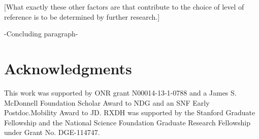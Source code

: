 \documentclass[10pt,letterpaper]{article}
\begin{document}
[What exactly these other factors are that contribute to the choice of level of reference is to be determined by further research.]

-Concluding paragraph-






\section{\bf Acknowledgments}

This work was supported by ONR grant N00014-13-1-0788 and a James S. McDonnell Foundation Scholar Award to NDG and an SNF Early Postdoc.Mobility Award to JD. RXDH was supported by the Stanford Graduate Fellowship and the National Science Foundation Graduate Research Fellowship under Grant No. DGE-114747.

\small




\setlength{\bibleftmargin}{.125in}
\setlength{\bibindent}{-\bibleftmargin}


\end{document}
